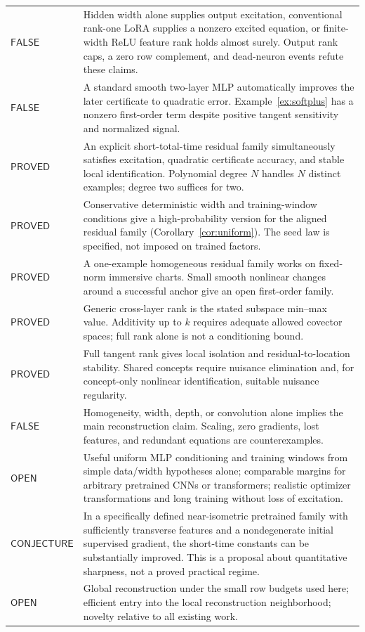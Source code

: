 \documentclass[12pt,a4paper]{article}
\theoremstyle{readable}
\theoremstyle{definition}\newtheorem{example}[theorem]{Example}
\newcommand{\PP}{\mathsf{PROVED}}\newcommand{\FF}{\mathsf{FALSE}}
\newcommand{\OO}{\mathsf{OPEN}}\newcommand{\CC}{\mathsf{CONJECTURE}}
\begin{document}
\begin{longtable}{@{}p{31mm}p{114mm}@{}}
\(\FF\)& Hidden width alone supplies output excitation, conventional rank-one LoRA supplies a nonzero excited equation, or finite-width ReLU feature rank holds almost surely. Output rank caps, a zero row complement, and dead-neuron events refute these claims.\\
\(\FF\)& A standard smooth two-layer MLP automatically improves the later certificate to quadratic error. Example~\ref{ex:softplus} has a nonzero first-order term despite positive tangent sensitivity and normalized signal.\\
\(\PP\)& An explicit short-total-time residual family simultaneously satisfies excitation, quadratic certificate accuracy, and stable local identification. Polynomial degree \(N\) handles \(N\) distinct examples; degree two suffices for two.\\
\(\PP\)& Conservative deterministic width and training-window conditions give a high-probability version for the aligned residual family (Corollary~\ref{cor:uniform}). The seed law is specified, not imposed on trained factors.\\
\(\PP\)& A one-example homogeneous residual family works on fixed-norm immersive charts. Small smooth nonlinear changes around a successful anchor give an open first-order family.\\
\(\PP\)& Generic cross-layer rank is the stated subspace min--max value. Additivity up to \(k\) requires adequate allowed covector spaces; full rank alone is not a conditioning bound.\\
\(\PP\)& Full tangent rank gives local isolation and residual-to-location stability. Shared concepts require nuisance elimination and, for concept-only nonlinear identification, suitable nuisance regularity.\\
\(\FF\)& Homogeneity, width, depth, or convolution alone implies the main reconstruction claim. Scaling, zero gradients, lost features, and redundant equations are counterexamples.\\
\(\OO\)& Useful uniform MLP conditioning and training windows from simple data/width hypotheses alone; comparable margins for arbitrary pretrained CNNs or transformers; realistic optimizer transformations and long training without loss of excitation.\\
\(\CC\)& In a specifically defined near-isometric pretrained family with sufficiently transverse features and a nondegenerate initial supervised gradient, the short-time constants can be substantially improved. This is a proposal about quantitative sharpness, not a proved practical regime.\\
\(\OO\)& Global reconstruction under the small row budgets used here; efficient entry into the local reconstruction neighborhood; novelty relative to all existing work.\\\bottomrule
\end{longtable}
\end{document}

